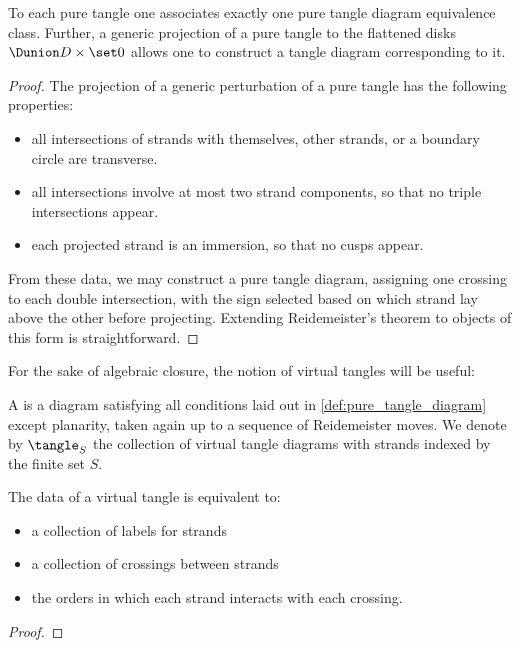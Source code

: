 \begin{theorem}\label{thm:pure_tangle}
        To each pure tangle one associates exactly one pure tangle diagram
        equivalence class. Further, a generic projection of a pure tangle to the
        flattened disks $\Dunion D\times\set0$ allows one to construct a tangle
        diagram corresponding to it.
\end{theorem}
\begin{proof}
        The projection of a generic perturbation of a pure tangle has the
        following properties:
        \begin{itemize}
                \item all intersections of strands with
                                themselves,
                                other strands, or
                                a boundary circle
                are transverse.
                \item all intersections involve at most two strand components,
                        so that no triple intersections appear.
                \item each projected strand is an immersion, so that no cusps
                        appear.
        \end{itemize}
        From these data, we may construct a pure tangle diagram, assigning one
        crossing to each double intersection, with the sign selected based on
        which strand lay above the other before projecting. Extending
        Reidemeister's theorem to objects of this form is straightforward.
\end{proof}

For the sake of algebraic closure, the notion of virtual tangles will be useful:
\begin{definition}
        A  is a diagram satisfying all conditions
        laid out in \cref{def:pure_tangle_diagram} except planarity, taken again
        up to a sequence of Reidemeister moves. We denote by $\tangle_S$ the
        collection of virtual tangle diagrams with strands indexed by the finite
        set $S$.
\end{definition}

\begin{theorem}
        The data of a virtual tangle is equivalent to:
        \begin{itemize}
                \item a collection of labels for strands
                \item a collection of crossings between strands
                \item the orders in which each strand interacts with each
                  crossing.
        \end{itemize}
\end{theorem}
\begin{proof}
        
\end{proof}

